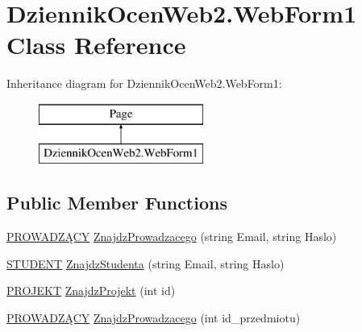 \hypertarget{class_dziennik_ocen_web2_1_1_web_form1}{}\section{Dziennik\+Ocen\+Web2.\+Web\+Form1 Class Reference}
\label{class_dziennik_ocen_web2_1_1_web_form1}
Inheritance diagram for Dziennik\+Ocen\+Web2.\+Web\+Form1\+:\begin{figure}[H]
\begin{center}
\leavevmode
\includegraphics[height=2.000000cm]{class_dziennik_ocen_web2_1_1_web_form1}
\end{center}
\end{figure}
\subsection*{Public Member Functions}
\begin{DoxyCompactItemize}
\item 
\hyperlink{class_dziennik_ocen_web2_1_1_p_r_o_w_a_d_z_xC4_x84_c_y}{P\+R\+O\+W\+A\+D\+ZĄ\+CY} \hyperlink{class_dziennik_ocen_web2_1_1_web_form1_a2ba456de96b092f21e9a9a2d5a58f790}{Znajdz\+Prowadzacego} (string Email, string Haslo)
\item 
\hyperlink{class_dziennik_ocen_web2_1_1_s_t_u_d_e_n_t}{S\+T\+U\+D\+E\+NT} \hyperlink{class_dziennik_ocen_web2_1_1_web_form1_a2f9720fae025bfdbf899348616030c5c}{Znajdz\+Studenta} (string Email, string Haslo)
\item 
\hyperlink{class_dziennik_ocen_web2_1_1_p_r_o_j_e_k_t}{P\+R\+O\+J\+E\+KT} \hyperlink{class_dziennik_ocen_web2_1_1_web_form1_a5c395860f5810991b3791d6cfb099e67}{Znajdz\+Projekt} (int id)
\item 
\hyperlink{class_dziennik_ocen_web2_1_1_p_r_o_w_a_d_z_xC4_x84_c_y}{P\+R\+O\+W\+A\+D\+ZĄ\+CY} \hyperlink{class_dziennik_ocen_web2_1_1_web_form1_ade7bba3c68800a6cb44849abd379edc3}{Znajdz\+Prowadzacego} (int id\+\_\+przedmiotu)
\end{DoxyCompactItemize}
